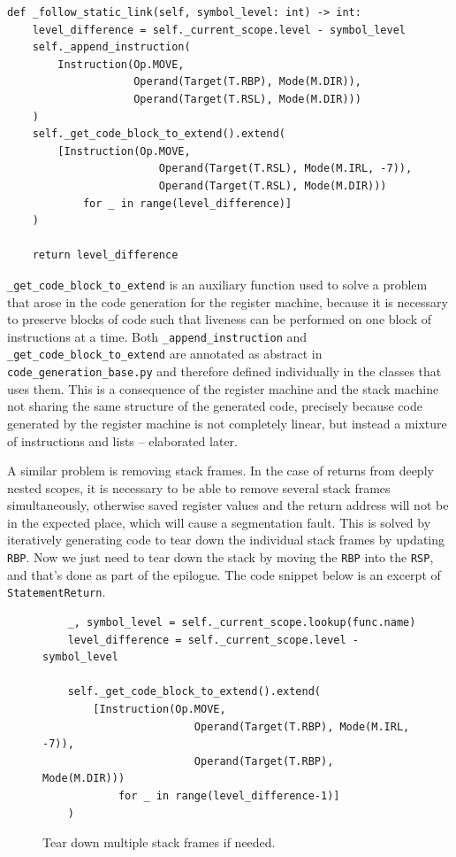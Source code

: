\begin{verbatim}
def _follow_static_link(self, symbol_level: int) -> int:
    level_difference = self._current_scope.level - symbol_level
    self._append_instruction(
        Instruction(Op.MOVE,
                    Operand(Target(T.RBP), Mode(M.DIR)),
                    Operand(Target(T.RSL), Mode(M.DIR)))
    )
    self._get_code_block_to_extend().extend(
        [Instruction(Op.MOVE,
                        Operand(Target(T.RSL), Mode(M.IRL, -7)),
                        Operand(Target(T.RSL), Mode(M.DIR)))
            for _ in range(level_difference)]
    )

    return level_difference
\end{verbatim}

\texttt{\_get\_code\_block\_to\_extend} is an auxiliary function used to solve a problem that arose in the code generation for the register machine, because it is necessary to preserve blocks of code such that liveness can be performed on one block of instructions at a time. Both \texttt{\_append\_instruction} and \texttt{\_get\_code\_block\_to\_extend} are annotated as abstract in \texttt{code\_generation\_base.py} and therefore defined individually in the classes that uses them. This is a consequence of the register machine and the stack machine not sharing the same structure of the generated code, precisely because code generated by the register machine is not completely linear, but instead a mixture of instructions and lists -- elaborated later.

A similar problem is removing stack frames. In the case of returns from deeply nested scopes, it is necessary to be able to remove several stack frames simultaneously, otherwise saved register values and the return address will not be in the expected place, which will cause a segmentation fault. This is solved by iteratively generating code to tear down the individual stack frames by updating \texttt{RBP}. Now we just need to tear down the stack by moving the \texttt{RBP} into the \texttt{RSP}, and that's done as part of the epilogue. The code snippet below is an excerpt of \texttt{StatementReturn}.

\begin{figure}[H]
    \centering
\begin{verbatim}
    _, symbol_level = self._current_scope.lookup(func.name)
    level_difference = self._current_scope.level - symbol_level
    
    self._get_code_block_to_extend().extend(
        [Instruction(Op.MOVE,
                        Operand(Target(T.RBP), Mode(M.IRL, -7)),
                        Operand(Target(T.RBP), Mode(M.DIR)))
            for _ in range(level_difference-1)]
    )
    \end{verbatim}
    \caption{Tear down multiple stack frames if needed.}
    \label{fig:remove_stack_frames}
\end{figure}

